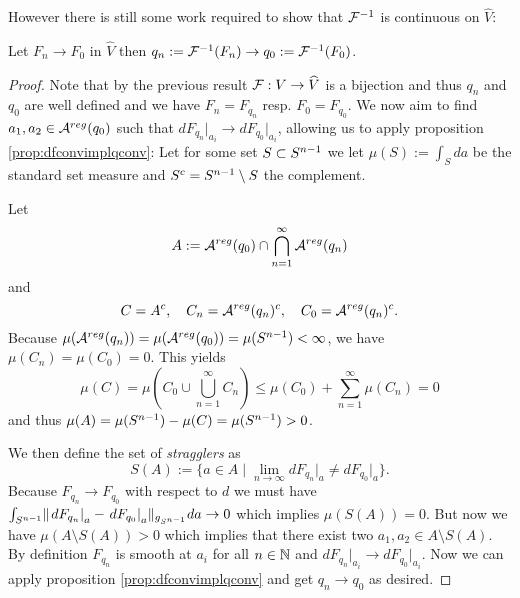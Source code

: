 However there is still some work required to show that $\mathcal{F}^{-1}$ is continuous on $\widehat{V}$:
\begin{lemma}\label{prop:frevcont} Let $F_n \to F_0$ in $\widehat{V}$ then $q_n:=\mathcal{F}^{-1}(F_n) \to q_0:=\mathcal{F}^{-1}(F_0)$.
\end{lemma}
\begin{proof}
    Note that by the previous result $\mathcal{F}:V\to \widehat{V}$ is a bijection and thus $q_n$ and $q_0$ are well defined and we have $F_n = F_{q_n}$ resp. $F_0 = F_{q_0}$. We now aim to find $a_1,a_2\in {{\mathcal{A}}^{reg}}(q_0)$ such that $dF_{q_n}\rvert_{a_i}\to dF_{q_0}\rvert_{a_i}$, allowing us to apply proposition \ref{prop:dfconvimplqconv}: Let for some set $S\subset {S^{n-1}}$ we let $\mu(S):= \int_{S}da$ be the standard set measure and $S^c = {S^{n-1}} \setminus S$ the complement.

    Let \[
        A:={{\mathcal{A}}^{reg}}(q_0) \cap \bigcap_{n=1}^{\infty}{{\mathcal{A}}^{reg}}(q_n)
    \] and
    \[
        C = A^c, \quad C_n = {{\mathcal{A}}^{reg}}(q_n)^c, \quad C_0 = {{\mathcal{A}}^{reg}}(q_n)^c.
    \]
    Because $\mu({{\mathcal{A}}^{reg}}(q_n))=\mu({{\mathcal{A}}^{reg}}(q_0))=\mu({S^{n-1}})<\infty$, we have $\mu(C_n)=\mu(C_0)=0$. This yields 
    \[
        \mu(C)= \mu\left(C_0 \cup \bigcup_{n=1}^{\infty}C_n\right) \leq \mu(C_0) + \sum_{n=1}^\infty \mu(C_n) = 0
    \] and thus $\mu(A)=\mu({S^{n-1}})-\mu(C)=\mu({S^{n-1}})>0$.

    We then define the set of \emph{stragglers} as 
    \[
        S(A):=\{a\in A \mid \lim_{n\to \infty} dF_{q_n}\rvert_a \neq dF_{q_0}\rvert_a\}.
    \] Because $F_{q_n}\to F_{q_0}$ with respect to $d$ we must have $\int_{{S^{n-1}}} \lVert \left.dF_{q_n}\right\rvert_a - \left.dF_{q_0}\right\rvert_a \rVert_{g_{S^{n-1}}}da \to 0$ which implies $\mu(S(A))=0$. But now we have $\mu(A\setminus S(A)) > 0$ which implies that there exist two $a_1,a_2\in A\setminus S(A)$. By definition $F_{q_n}$ is smooth at $a_i$ for all $n\in \mathbb{N}$ and $dF_{q_n}\rvert_{a_i} \to dF_{q_0}\rvert_{a_i}$. Now we can apply proposition \ref{prop:dfconvimplqconv} and get $q_n\to q_0$ as desired.
\end{proof}



